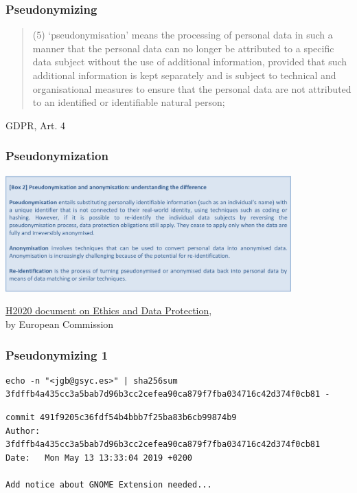 \documentclass[17pt,aspectratio=169,hyperref={pdfusetitle,colorlinks,allcolors=olive}]{beamer}
\begin{document}
\begin{frame}[fragile]
  \frametitle{Pseudonymizing}

  {\footnotesize
  \begin{quotation}
    (5) ‘pseudonymisation’ means the processing of personal data in such a manner that the personal data can no longer be attributed to a specific data subject without the use of additional information, provided that such additional information is kept separately and is subject to technical and organisational measures to ensure that the personal data are not attributed to an identified or identifiable natural person;
  \end{quotation}
  }
  
  \begin{flushright}
    GDPR, Art. 4
  \end{flushright}
\end{frame}

\begin{frame}[fragile]
  \frametitle{Pseudonymization}

  \begin{center}
  \includegraphics[width=11cm]{figs/gdpr-pseudonymization}
  \end{center}  
  
  {\footnotesize
    \begin{flushright}
    \href{https://ec.europa.eu/research/participants/data/ref/h2020/grants_manual/hi/ethics/h2020_hi_ethics-data-protection_en.pdf}{H2020 document on Ethics and Data Protection}, \\ by European Commission
  \end{flushright}
  }
\end{frame}

\begin{frame}[fragile]
  \frametitle{Pseudonymizing 1}

{\small
\begin{verbatim}
echo -n "<jgb@gsyc.es>" | sha256sum 
3fdffb4a435cc3a5bab7d96b3cc2cefea90ca879f7fba034716c42d374f0cb81 -
\end{verbatim}
}  

{\small
\begin{verbatim}
commit 491f9205c36fdf54b4bbb7f25ba83b6cb99874b9
Author: 3fdffb4a435cc3a5bab7d96b3cc2cefea90ca879f7fba034716c42d374f0cb81
Date:   Mon May 13 13:33:04 2019 +0200

Add notice about GNOME Extension needed...
\end{verbatim}  
}

\end{frame}
\end{document}
